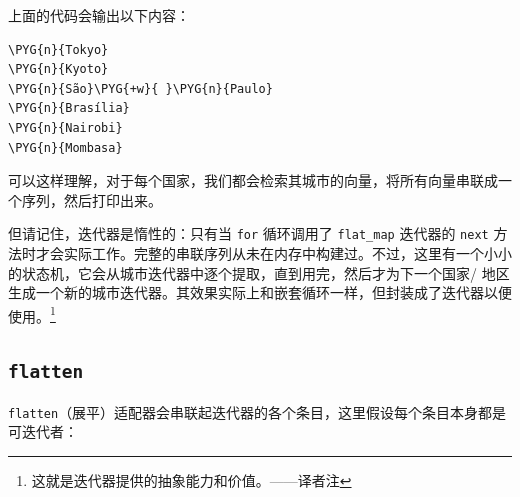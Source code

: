 上面的代码会输出以下内容：

\begin{Verbatim}[commandchars=\\\{\},breaklines=true,breakanywhere=true,fontsize=\codefont,xleftmargin=17bp]
\PYG{n}{Tokyo}
\PYG{n}{Kyoto}
\PYG{n}{São}\PYG{+w}{ }\PYG{n}{Paulo}
\PYG{n}{Brasília}
\PYG{n}{Nairobi}
\PYG{n}{Mombasa}
\end{Verbatim}

可以这样理解，对于每个国家，我们都会检索其城市的向量，将所有向量串联成一个序列，然后打印出来。

但请记住，迭代器是惰性的：只有当 \texttt{for} 循环调用了 \texttt{flat\_map} 迭代器的 \texttt{next} 方法时才会实际工作。完整的串联序列从未在内存中构建过。不过，这里有一个小小的状态机，它会从城市迭代器中逐个提取，直到用完，然后才为下一个国家/ 地区生成一个新的城市迭代器。其效果实际上和嵌套循环一样，但封装成了迭代器以便使用。\footnote{这就是迭代器提供的抽象能力和价值。——译者注}

\subsection{\texttt{flatten}}

\texttt{flatten}（展平）适配器会串联起迭代器的各个条目，这里假设每个条目本身都是可迭代者：

